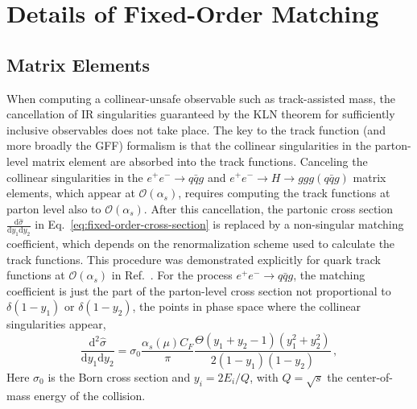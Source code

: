 \documentclass[letterpaper,11pt]{article}
\newcommand{\Ref}[1]{Ref.~\cite{#1}}
\newcommand{\Eq}[1]{Eq.~\eqref{#1}}
\begin{document}

\section{Details of Fixed-Order Matching}
\label{app:details}




\subsection{Matrix Elements}
\label{app:details-me}

When computing a collinear-unsafe observable such as track-assisted mass, the cancellation of IR singularities guaranteed by the KLN theorem for sufficiently inclusive observables does not take place. 
%
The key to the track function (and more broadly the GFF) formalism is that the collinear singularities in the parton-level matrix element are absorbed into the track functions. 
%
Canceling the collinear singularities in the $e^+e^-\rightarrow q\bar{q}g$ and $e^+e^-\rightarrow H \rightarrow ggg(q\bar{q}g)$ matrix elements, which appear at $\mathcal{O}(\alpha_s)$, requires computing the track functions at parton level also to $\mathcal{O}(\alpha_s)$. 
%
After this cancellation, the partonic cross section $\frac{\text{d}\hat{\sigma}}{\text{d}y_1\text{d}y_2}$ in \Eq{eq:fixed-order-cross-section} is replaced by a non-singular matching coefficient, which depends on the renormalization scheme used to calculate the track functions. 
%
This procedure was demonstrated explicitly for quark track functions at $\mathcal{O}(\alpha_s)$ in \Ref{Chang:2013rca}. 
%
For the process $e^+e^-\rightarrow q\bar{q}g$, the matching coefficient is just the part of the parton-level cross section not proportional to $\delta(1-y_1)$ or $\delta(1-y_2)$, the points in phase space where the collinear singularities appear,
\begin{equation}
\frac{\text{d}^2\hat{\sigma}}{\text{d}y_1\text{d}y_2} = \sigma_0 \frac{\alpha_s(\mu) C_F}{\pi} \frac{\Theta(y_1+y_2-1)(y_1^2+y_2^2)}{2(1-y_1)(1-y_2)}\,,
\end{equation}
Here $\sigma_0$ is the Born cross section and $y_i = 2E_i/Q$, with $Q=\sqrt{s}$ the center-of-mass energy of the collision. 
\end{document}
